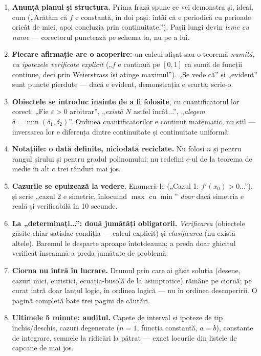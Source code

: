 \begin{enumerate}[leftmargin=*, itemsep=2pt]
\item \textbf{Anunță planul și structura.} Prima frază spune ce vei demonstra și, ideal, cum („Arătăm că $f$ e constantă, în doi pași: întâi că e periodică cu perioade oricât de mici, apoi concluzia prin continuitate.''). Pașii lungi devin \emph{leme cu nume} --- corectorul punctează pe schema ta, nu pe a lui.
\item \textbf{Fiecare afirmație are o acoperire:} un calcul afișat sau o teoremă \emph{numită, cu ipotezele verificate explicit} („$f$ e continuă pe $[0,1]$ ca sumă de funcții continue, deci prin Weierstrass își atinge maximul''). „Se vede că'' și „evident'' sunt puncte pierdute --- dacă e evident, demonstrația e scurtă; scrie-o.
\item \textbf{Obiectele se introduc înainte de a fi folosite}, cu cuantificatorul lor corect: „Fie $\varepsilon>0$ arbitrar'', „\emph{există} $N$ astfel încât...'', „\emph{alegem} $\delta=\min(\delta_1,\delta_2)$''. Ordinea cuantificatorilor e conținut matematic, nu stil --- inversarea lor e diferența dintre continuitate și continuitate uniformă.
\item \textbf{Notațiile: o dată definite, niciodată reciclate.} Nu folosi $n$ și pentru rangul șirului și pentru gradul polinomului; nu redefini $c$-ul de la teorema de medie în alt $c$ trei rânduri mai jos.
\item \textbf{Cazurile se epuizează la vedere.} Enumeră-le („Cazul 1: $f'(x_0)>0$...''), și scrie „cazul 2 e simetric, înlocuind $\max$ cu $\min$'' \emph{doar} dacă simetria e reală și verificabilă în 10 secunde.
\item \textbf{La „determinați...'': două jumătăți obligatorii.} \emph{Verificarea} (obiectele găsite chiar satisfac condiția --- calcul explicit) și \emph{clasificarea} (nu există altele). Baremul le desparte aproape întotdeauna; a preda doar ghicitul verificat înseamnă a preda jumătate de problemă.
\item \textbf{Ciorna nu intră în lucrare.} Drumul prin care ai găsit soluția (desene, cazuri mici, euristici, ecuația-busolă de la asimptotice) rămâne pe ciornă; pe curat intră doar lanțul logic, în ordinea logică --- nu în ordinea descoperirii. O pagină completă bate trei pagini de căutări.
\item \textbf{Ultimele 5 minute: auditul.} Capete de interval și ipoteze de tip închis/deschis, cazuri degenerate ($n=1$, funcția constantă, $a=b$), constante de integrare, semnele la ridicări la pătrat --- exact locurile din listele de capcane de mai jos.
\end{enumerate}

